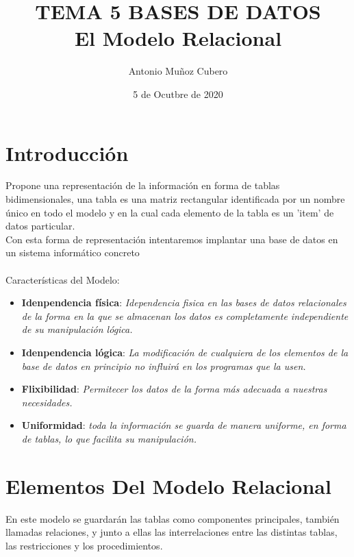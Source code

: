 \documentclass{article}
\title{TEMA 5 BASES DE DATOS \\ El Modelo Relacional}
\author{Antonio Muñoz Cubero}
\date{5 de Ocutbre de 2020}
\begin{document}
\maketitle
{}

\newpage
\tableofcontents
{}

\newpage
\section{Introducción}
Propone una representación de la información en forma de tablas bidimensionales, una tabla es una matriz rectangular identificada
por un nombre único en todo el modelo y en la cual cada elemento de la tabla es un 'item' de datos particular.
\\
Con esta forma de representación intentaremos implantar una base de datos en un sistema informático concreto
\\
\\
Características del Modelo:

  \begin{itemize}
    \item \textbf{Idenpendencia física}: \textit{Idependencia fisica en las bases de datos relacionales de la forma en la que se almacenan los datos es completamente independiente
    de su manipulación lógica.}
    \item \textbf{Idenpendencia lógica}: \textit{La modificación de cualquiera de los elementos de la base de datos en principio no influirá en los
    programas que la usen.}
    \item \textbf{Flixibilidad}: \textit{Permitecer los datos de la forma más adecuada a nuestras necesidades.}
    \item \textbf{Uniformidad}: \textit{toda la información se guarda de manera uniforme, en forma de tablas, lo que facilita su manipulación.}
  \end{itemize}

\section{Elementos Del Modelo Relacional}
En este modelo se guardarán las tablas como componentes principales, también llamadas relaciones, y junto a ellas las interrelaciones entre 
las distintas tablas, las restricciones y los procedimientos.
\end{document}
